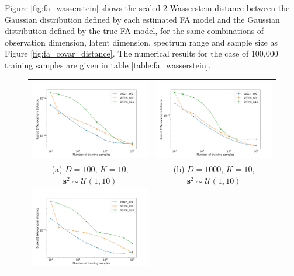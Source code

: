 \documentclass[msc,deptreport.inf]{infthesis} %
\newcommand{\matr}[1]{\mathbf{#1}}
\begin{document}
Figure \ref{fig:fa_wasserstein} shows the scaled 2-Wasserstein distance between the Gaussian distribution defined by each estimated FA model and the Gaussian distribution defined by the true FA model, for the same combinations of observation dimension, latent dimension, spectrum range and sample size as Figure \ref{fig:fa_covar_distance}. The numerical results for the case of 100,000 training samples are given in table \ref{table:fa_wasserstein}.
\begin{figure}[!htbp] 
	\begin{tabular}{cc}
		\includegraphics[width=70mm]{plots/online_fa_wasserstein__observation_dim=100__latent_dim=10__spectrum_min=1__spectrum_max=10.png}
		& \includegraphics[width=70mm]{plots/online_fa_wasserstein__observation_dim=1000__latent_dim=10__spectrum_min=1__spectrum_max=10.png} \\
		(a) $D=100$, $K=10$, $\matr{s}^2 \sim \mathcal{U}(1, 10)$ 
		 & (b) $D=1000$, $K=10$, $\matr{s}^2 \sim \mathcal{U}(1, 10)$\\[6pt] 
		 \includegraphics[width=70mm]{plots/online_fa_wasserstein__observation_dim=100__latent_dim=10__spectrum_min=1__spectrum_max=100.png} 

\end{tabular}
\end{figure}
\end{document}
